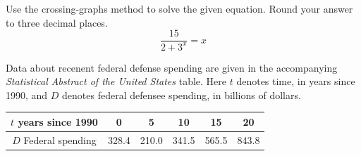 \documentclass[12pt,addpoints]{exam}
\begin{document}
\begin{questions}

	\newpage

	\question[5] Use the crossing-graphs method to solve the given equation. Round your answer to three decimal places.
	$$ \frac{15}{2 + 3^x} = x$$ \vspace{1in}
	
	\question Data about recenent federal defense spending are given in the accompanying \textit{Statistical Abstract of the United States} table. Here $t$ denotes time, in years since 1990, and $D$ denotes federal defensee spending, in billions of dollars.
	
	\begin{tabular}{|c|c|c|c|c|c|} \hline
	$t$ years since 1990 & 0 & 5 & 10 & 15 & 20 \\ \hline
	$D$ Federal spending & 328.4 & 210.0 & 341.5 & 565.5 & 843.8 \\ \hline
	\end{tabular}



\end{questions}
\end{document}
